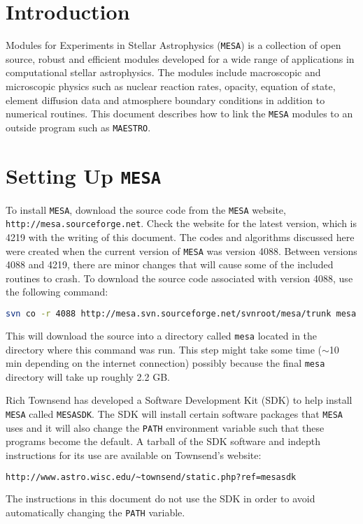 
\section{Introduction}

Modules for Experiments in Stellar Astrophysics ({\tt MESA}) is a collection 
of open source, robust and efficient modules developed for a wide range of 
applications in computational stellar astrophysics. The modules include 
macroscopic and microscopic physics such as nuclear reaction rates, opacity, 
equation of state, element diffusion data and atmosphere boundary conditions 
in addition to numerical routines. This document describes how to link the 
{\tt MESA} modules to an outside program such as {\tt MAESTRO}.


\section{Setting Up {\tt MESA}}

To install {\tt MESA}, download the source code from the {\tt MESA} website, 
{\tt http://mesa.sourceforge.net}. Check the website for the latest version, 
which is 4219 with the writing of this document. The codes and algorithms 
discussed here were created when the current version of {\tt MESA} was 
version 4088. Between versions 4088 and 4219, there are minor changes that 
will cause some of the included routines to crash. To download the source code 
associated with version 4088, use the following command:
\begin{lstlisting}[language=bash,mathescape=false]
  svn co -r 4088 http://mesa.svn.sourceforge.net/svnroot/mesa/trunk mesa
\end{lstlisting}
This will download the source into a directory called {\tt mesa} located 
in the directory where this command was run. This step might take some time 
($\sim$10 min depending on the internet connection) possibly because the 
final {\tt mesa} directory will take up roughly 2.2 GB.

Rich Townsend has developed a Software Development Kit (SDK) to help install 
{\tt MESA} called {\tt MESASDK}. The SDK will install certain software 
packages that {\tt MESA} uses and it will also change the {\tt PATH} 
environment variable such that these programs become the default. A tarball 
of the SDK software and indepth instructions for its use are available on 
Townsend's website:
\begin{lstlisting}[language=html,mathescape=false]
  http://www.astro.wisc.edu/~townsend/static.php?ref=mesasdk
\end{lstlisting}
The instructions in this document do not use the SDK in order to avoid 
automatically changing the {\tt PATH} variable.

